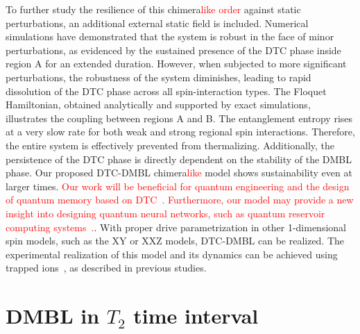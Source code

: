 \documentclass[12pt]{iopart}
\newcommand{\red}[1]{\textcolor{red}{#1}}
\begin{document}
To further study the resilience of this chimera\red{like order} against static perturbations, an additional external static field is included. Numerical simulations have demonstrated that the system is robust in the face of minor perturbations, as evidenced by the sustained presence of the DTC phase inside region A for an extended duration. However, when subjected to more significant perturbations, the robustness of the system diminishes, leading to rapid dissolution of the DTC phase across all spin-interaction types. The Floquet Hamiltonian, obtained analytically and supported by exact simulations, illustrates the coupling between regions A and B. The entanglement entropy rises at a very slow rate for both weak and strong regional spin interactions. Therefore, the entire system is effectively prevented from thermalizing. Additionally, the persistence of the DTC phase is directly dependent on the stability of the DMBL phase. Our proposed DTC-DMBL chimera\red{like} model shows sustainability even at larger times. \red{Our work will be beneficial for quantum engineering and the design of quantum memory based on DTC~\cite{zhang_observation_2017}. Furthermore, our model may provide a new insight into designing quantum neural networks, such as quantum reservoir computing systems~\cite{Fujii_2017, Martinez_2021,Mujal_2021, Akitada2022}.}. With proper drive parametrization in other 1-dimensional spin models, such as the XY or XXZ models, DTC-DMBL can be realized. The experimental realization of this model and its dynamics can be achieved using trapped ions~\cite{sakurai_phys_nodate, Friedenauer2008}, as described in previous studies.
	
\medskip

\clearpage

\appendix
\section{\label{sec:AppendixA} DMBL in $T_2$ time interval}
\end{document}
